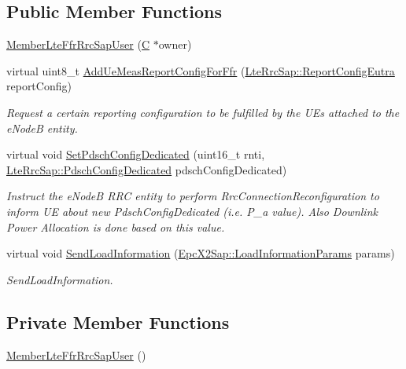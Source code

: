 \subsection*{Public Member Functions}
\begin{DoxyCompactItemize}
\item 
\hyperlink{classns3_1_1MemberLteFfrRrcSapUser_a9040d10cdcc7b2a188823b0ee9cdd65a}{Member\+Lte\+Ffr\+Rrc\+Sap\+User} (\hyperlink{loss__COST231__small__cities__urban_8m_aaa53ca0b650dfd85c4f59fa156f7a2cc}{C} $\ast$owner)
\item 
virtual uint8\+\_\+t \hyperlink{classns3_1_1MemberLteFfrRrcSapUser_a4d00a6591eda143e0995e352a106ffc0}{Add\+Ue\+Meas\+Report\+Config\+For\+Ffr} (\hyperlink{structns3_1_1LteRrcSap_1_1ReportConfigEutra}{Lte\+Rrc\+Sap\+::\+Report\+Config\+Eutra} report\+Config)
\begin{DoxyCompactList}\small\item\em Request a certain reporting configuration to be fulfilled by the U\+Es attached to the e\+NodeB entity. \end{DoxyCompactList}\item 
virtual void \hyperlink{classns3_1_1MemberLteFfrRrcSapUser_ad26c6bca4e9614ddad29e728b39b8a59}{Set\+Pdsch\+Config\+Dedicated} (uint16\+\_\+t rnti, \hyperlink{structns3_1_1LteRrcSap_1_1PdschConfigDedicated}{Lte\+Rrc\+Sap\+::\+Pdsch\+Config\+Dedicated} pdsch\+Config\+Dedicated)
\begin{DoxyCompactList}\small\item\em Instruct the e\+NodeB R\+RC entity to perform Rrc\+Connection\+Reconfiguration to inform UE about new Pdsch\+Config\+Dedicated (i.\+e. P\+\_\+a value). Also Downlink Power Allocation is done based on this value. \end{DoxyCompactList}\item 
virtual void \hyperlink{classns3_1_1MemberLteFfrRrcSapUser_a4307646c40cf68412d1f0191d3da339e}{Send\+Load\+Information} (\hyperlink{structns3_1_1EpcX2Sap_1_1LoadInformationParams}{Epc\+X2\+Sap\+::\+Load\+Information\+Params} params)
\begin{DoxyCompactList}\small\item\em Send\+Load\+Information. \end{DoxyCompactList}\end{DoxyCompactItemize}
\subsection*{Private Member Functions}
\begin{DoxyCompactItemize}
\item 
\hyperlink{classns3_1_1MemberLteFfrRrcSapUser_aa7b3559581697c112becad5cfd93bf4e}{Member\+Lte\+Ffr\+Rrc\+Sap\+User} ()
\end{DoxyCompactItemize}
